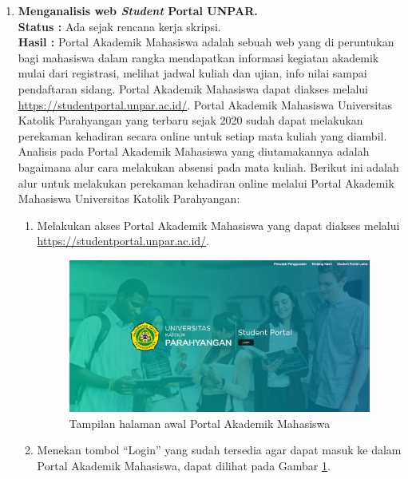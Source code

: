 \documentclass[a4paper,twoside]{article}
\begin{document}
\begin{enumerate}
		\item \textbf{Menganalisis web \textit{Student} Portal UNPAR.}\\
		{\bf Status :} Ada sejak rencana kerja skripsi.\\
		{\bf Hasil :} Portal Akademik Mahasiswa adalah sebuah web yang di peruntukan bagi mahasiswa dalam rangka mendapatkan informasi kegiatan akademik mulai dari registrasi, melihat jadwal kuliah dan ujian, info nilai sampai pendaftaran sidang. Portal Akademik Mahasiswa dapat diakses melalui \url{https://studentportal.unpar.ac.id/}. Portal Akademik Mahasiswa Universitas Katolik Parahyangan yang terbaru sejak 2020 sudah dapat melakukan perekaman kehadiran secara online untuk setiap mata kuliah yang diambil. Analisis pada Portal Akademik Mahasiswa yang diutamakannya adalah bagaimana alur cara melakukan absensi pada mata kuliah. Berikut ini adalah alur untuk melakukan perekaman kehadiran online melalui Portal Akademik Mahasiswa Universitas Katolik Parahyangan:
		\begin{enumerate}
			\item Melakukan akses Portal Akademik Mahasiswa yang dapat diakses melalui \url{https://studentportal.unpar.ac.id/}.
			\begin{figure}[H]
				\centering
				\includegraphics[scale=0.225]{Gambar/halaman2019.jpg}
				\caption{Tampilan halaman awal Portal Akademik Mahasiswa} 
				\label{fig:studpor_home_2019}
			\end{figure}
			\item Menekan tombol ``Login'' yang sudah tersedia agar dapat masuk ke dalam Portal Akademik Mahasiswa, dapat dilihat pada Gambar \ref{fig:studpor_home_2019}.
			

\end{enumerate}
\end{enumerate}
\end{document}
